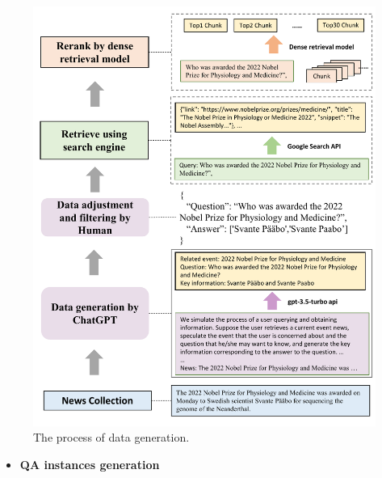 \documentclass{beamer}
\begin{document}
\begin{frame}
    \begin{figure}[h]
        \centering
        \includegraphics[height=.75\textheight]{./images/figures/data.pdf}
        \caption{The process of data generation.}
    \end{figure}
    \begin{itemize}
        \item {\bfseries{QA instances generation}}
    \end{itemize}
\end{frame}
\end{document}
